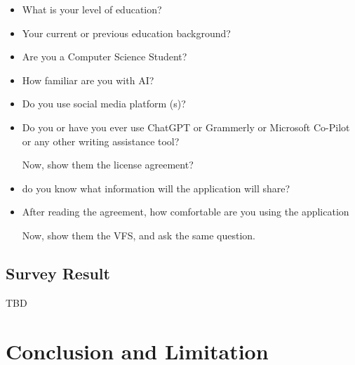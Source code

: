 \documentclass[manuscript,screen,review]{acmart}
\begin{document}
\begin{itemize}
	\item What is your level of education?
	\item Your current or previous education background?
	\item Are you a Computer Science Student?
	\item How familiar are you with AI?
	\item Do you use social media platform (s)?
	\item Do you or have you ever use ChatGPT or Grammerly or Microsoft Co-Pilot or any other writing assistance tool?
	
	Now, show them the license agreement?
	
	\item do you know what information will the application will share?
	\item After reading the agreement, how comfortable are you using the application
	
	Now, show them the VFS, and ask the same question.
	
\end{itemize}




\subsection{Survey Result}

TBD

\section{Conclusion and Limitation}
\end{document}
